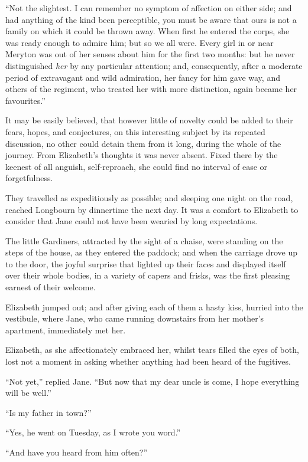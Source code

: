 ``Not the slightest. I can remember no symptom of affection on either side; and had anything of the kind been perceptible, you must be aware that ours is not a family on which it could be thrown away. When first he entered the corps, she was ready enough to admire him; but so we all were. Every girl in or near Meryton was out of her senses about him for the first two months: but he never distinguished \textit{her} by any particular attention; and, consequently, after a moderate period of extravagant and wild admiration, her fancy for him gave way, and others of the regiment, who treated her with more distinction, again became her favourites.''

It may be easily believed, that however little of novelty could be added to their fears, hopes, and conjectures, on this interesting subject by its repeated discussion, no other could detain them from it long, during the whole of the journey. From Elizabeth's thoughts it was never absent. Fixed there by the keenest of all anguish, self-reproach, she could find no interval of ease or forgetfulness.

They travelled as expeditiously as possible; and sleeping one night on the road, reached Longbourn by dinnertime the next day. It was a comfort to Elizabeth to consider that Jane could not have been wearied by long expectations.

The little Gardiners, attracted by the sight of a chaise, were standing on the steps of the house, as they entered the paddock; and when the carriage drove up to the door, the joyful surprise that lighted up their faces and displayed itself over their whole bodies, in a variety of capers and frisks, was the first pleasing earnest of their welcome.

Elizabeth jumped out; and after giving each of them a hasty kiss, hurried into the vestibule, where Jane, who came running downstairs from her mother's apartment, immediately met her.

Elizabeth, as she affectionately embraced her, whilst tears filled the eyes of both, lost not a moment in asking whether anything had been heard of the fugitives.

``Not yet,'' replied Jane. ``But now that my dear uncle is come, I hope everything will be well.''

``Is my father in town?''

``Yes, he went on Tuesday, as I wrote you word.''

``And have you heard from him often?''

